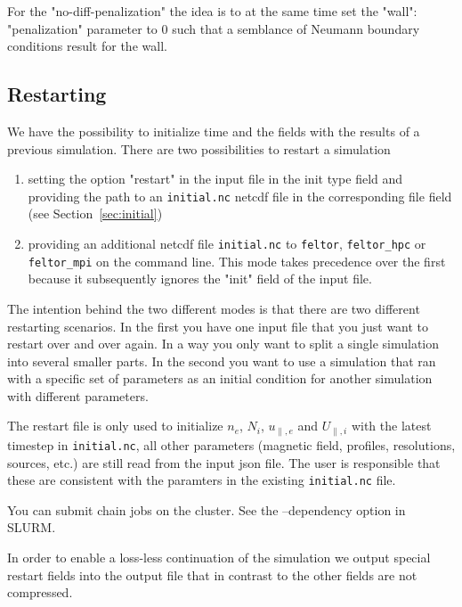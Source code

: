 For the "no-diff-penalization" the idea is to at the same time set
the "wall": "penalization" parameter to $0$ such that a semblance of
Neumann boundary conditions result for the wall.
\subsection{Restarting} \label{sec:restart}
We have the possibility to initialize time and
the fields with the results of a previous simulation.
There are two possibilities to restart a simulation
\begin{enumerate}
    \item setting the option "restart" in the input file in the init type field
        and providing the path to an \texttt{initial.nc} netcdf file in the
        corresponding file field (see Section~\ref{sec:initial})
    \item providing an additional netcdf file \texttt{initial.nc}
        to \texttt{feltor}, \texttt{feltor_hpc} or \texttt{feltor_mpi} on the
        command line. This mode takes precedence over the first because it
        subsequently ignores the "init" field of the input file.
\end{enumerate}
The intention behind the two different modes is that there are two different
restarting scenarios. In the first you have one input file that you just want
to restart over and over again. In a way you only want to split a single
simulation into several smaller parts. In the second you want to use a
simulation that ran with a specific set of parameters as an initial condition
for another simulation with different parameters.
\begin{tcolorbox}[title=Note]
    The restart file is only used to initialize $n_e$, $N_i$, $u_{\parallel,e}$
    and $U_{\parallel,i}$ with the latest timestep in \texttt{initial.nc}, all
    other parameters (magnetic field, profiles, resolutions, sources, etc.)
    are still read from the input json file.  The user is responsible
    that these are consistent with the paramters in the existing
    \texttt{initial.nc} file.
\end{tcolorbox}

\begin{tcolorbox}[title=Note]
    You can submit chain jobs on the cluster. See the --dependency option in SLURM.
\end{tcolorbox}
\begin{tcolorbox}[title=Note]
In order to enable a
loss-less continuation of the simulation we output special restart fields into
the output file that in contrast to the other fields are not compressed.
\end{tcolorbox}


